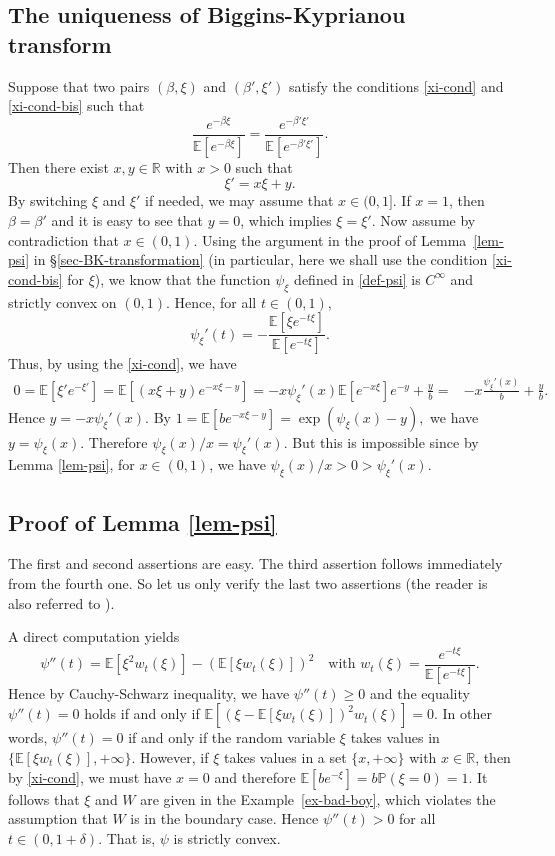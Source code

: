 \documentclass[12pt]{amsart}
\theoremstyle{definition}
\theoremstyle{remark}
\newcommand{\R}{\mathbb{R}}
\newcommand{\E}{\mathbb{E}}
\newcommand{\PP}{\mathbb{P}}
\numberwithin{equation}{section}
\begin{document}
\subsection{The uniqueness of Biggins-Kyprianou transform}\label{sec-xi}

Suppose that  two pairs $(\beta, \xi)$ and $(\beta', \xi')$ satisfy the conditions \eqref{xi-cond} and  \eqref{xi-cond-bis} such that 
\[
\frac{e^{-\beta \xi}}{\E[e^{-\beta \xi}]}  = \frac{e^{-\beta' \xi'}}{\E[e^{-\beta' \xi'}]}. 
\]
Then there exist $x, y\in \R$ with $x>0$ such that 
\[
\xi' = x\xi + y.
\]  
By switching $\xi$ and $\xi'$ if needed, we may assume that $x\in (0,1]$. If $x=1$, then $\beta  = \beta'$ and  it is easy to see that $y = 0$, which implies $\xi= \xi'$. Now assume by contradiction that $x\in (0,1)$. Using the argument in the proof  of Lemma~\ref{lem-psi} in \S \ref{sec-BK-transformation} (in particular, here we shall use the condition \eqref{xi-cond-bis} for $\xi$),  we know that the function $\psi_\xi$ defined in \eqref{def-psi} is $C^\infty$ and strictly convex on $(0,1)$. Hence, for all $t\in (0,1)$, 
\[
\psi_\xi'(t) = -\frac{\E[\xi e^{-t\xi}]}{\E[e^{-t\xi}]}. 
\] 
Thus, by using the \eqref{xi-cond}, we have 
\begin{align*}
0= \E[\xi' e^{-\xi'}]  =  \E[(x\xi + y) e^{-x \xi -y}]  = - x \psi_\xi'(x)   \E[e^{-x\xi}] e^{-y} + \frac{y}{b}
 =&  - x \frac{\psi_\xi'(x)}{b} + \frac{y}{b} . 
\end{align*}
Hence $y = - x \psi_\xi'(x)$. By
$
1 = \E[be^{-x\xi -y}]  = \exp(\psi_\xi(x) -y), 
$
we have  $y= \psi_\xi(x)$. Therefore $\psi_\xi(x)/x= \psi_\xi'(x)$. But this is impossible since by Lemma \ref{lem-psi}, for $x\in (0,1)$, we have $\psi_\xi(x)/x >0 > \psi_\xi'(x)$.  





\subsection{Proof of Lemma \ref{lem-psi}}\label{sec-psi-fn}


The first and second assertions are easy.    The third assertion follows immediately from the fourth one. So let us only verify the last two assertions (the reader is also referred to \cite[ArXiv version, Lemma A.1]{Jaffuel}).  

A direct computation yields
\[
\psi''(t)=\E[\xi^2  w_t(\xi)]-(\E[\xi w_t(\xi)])^2 \quad \text{with $w_t(\xi) = \frac{e^{-t\xi}}{\E[e^{-t\xi}]}$}.
\]
Hence by Cauchy-Schwarz inequality, we have $\psi''(t)\ge 0$ and the equality $\psi''(t)=0$ holds if and only if $\E[(\xi-   \E[\xi w_t(\xi)])^2 w_t(\xi)]  =0$. In other words, $\psi''(t) =0$ if and only if  the random variable  $\xi$ takes values in $\{\E[\xi w_t(\xi)], +\infty\}$.  However, if $\xi$ takes values in a set $\{x, +\infty\}$ with $x\in \R$, then by \eqref{xi-cond}, we must have $x= 0$ and therefore $\E[be^{-\xi}] =  b \PP(\xi = 0)  = 1$.  It follows that $\xi$ and $W$ are given in the Example~\ref{ex-bad-boy}, which violates the assumption that $W$ is in the boundary case.   Hence $\psi''(t)>0$ for all $t\in (0, 1+\delta)$. That is, $\psi$ is strictly convex. 
\end{document}
